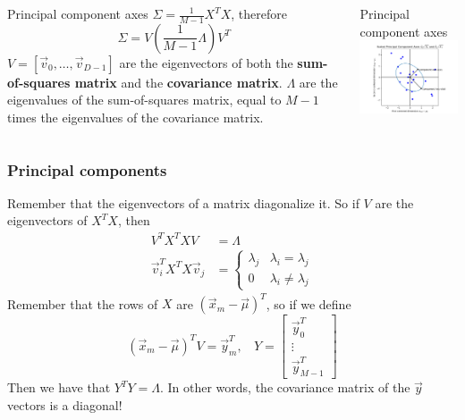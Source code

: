 \documentclass{beamer}
\begin{document}
\begin{frame}
  \begin{columns}
    \column{1.75in}
    \begin{block}{Principal component axes}
      $\Sigma=\frac{1}{M-1}X^TX$, therefore
      \[
      \Sigma=V\left(\frac{1}{M-1}\Lambda\right) V^T
      \]
      $V=[\vec{v}_0,\ldots,\vec{v}_{D-1}]$ are the eigenvectors of
      both the {\bf sum-of-squares matrix} and the {\bf covariance
        matrix}.  $\Lambda$ are the eigenvalues of the sum-of-squares
      matrix, equal to $M-1$ times the eigenvalues of the covariance
      matrix.
    \end{block}
    \column{2.625in}
    \begin{block}{Principal component axes}
      \includegraphics[width=2.5in]{principal_component_axes.png}
    \end{block}
  \end{columns}
\end{frame}

\begin{frame}
  \frametitle{Principal components}
  Remember that the eigenvectors of a matrix diagonalize it.
  So if $V$ are the eigenvectors of $X^TX$, then
  \begin{align*}
    V^TX^TXV &= \Lambda\\
    \vec{v}_i^T X^TX\vec{v}_j &= \begin{cases}
      \lambda_j & \lambda_i=\lambda_j\\
      0 & \lambda_i\ne \lambda_j
    \end{cases}
  \end{align*}
  Remember that the rows of $X$ are $(\vec{x}_m-\vec\mu)^T$, so if we
  define
  \[
  (\vec{x}_m-\vec\mu)^TV = \vec{y}_m^T,~~~~Y=
  \left[\begin{array}{c}\vec{y}_0^T\\\vdots\\\vec{y}_{M-1}^T\end{array}\right]
  \]
  Then we have that $Y^TY=\Lambda$.  In other words, the covariance
  matrix of the $\vec{y}$ vectors is a diagonal!
\end{frame}
\end{document}
